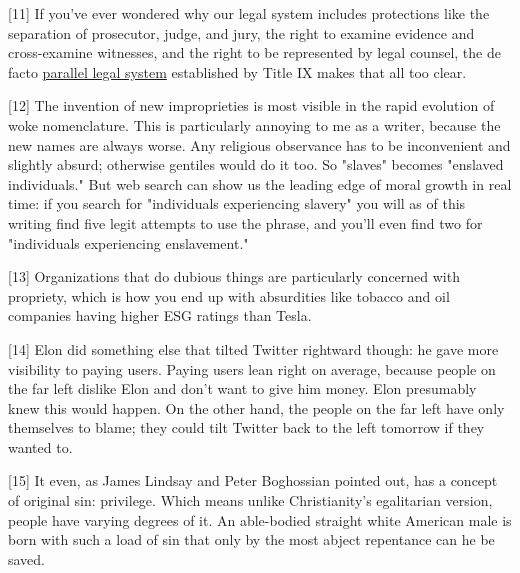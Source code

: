[11] If you've ever wondered why our legal system includes
                  protections like the separation of prosecutor, judge, and
                  jury, the right to examine evidence and cross-examine
                  witnesses, and the right to be represented by legal counsel,
                  the de facto
                  \href{https://www.nytimes.com/2020/03/18/magazine/title-ix-sexual-harassment-accusations.html}{parallel legal system}
                  established by Title IX makes that all too clear.

[12] The invention of new improprieties is most visible in the
                  rapid evolution of woke nomenclature. This is particularly
                  annoying to me as a writer, because the new names are always
                  worse. Any religious observance has to be inconvenient and
                  slightly absurd; otherwise gentiles would do it too. So
                  "slaves" becomes "enslaved individuals." But web search can
                  show us the leading edge of moral growth in real time: if you
                  search for "individuals experiencing slavery" you will as of
                  this writing find five legit attempts to use the phrase, and
                  you'll even find two for "individuals experiencing
                  enslavement."

[13] Organizations that do dubious things are particularly
                  concerned with propriety, which is how you end up with
                  absurdities like tobacco and oil companies having higher ESG
                  ratings than Tesla.

[14] Elon did something else that tilted Twitter rightward
                  though: he gave more visibility to paying users. Paying users
                  lean right on average, because people on the far left dislike
                  Elon and don't want to give him money. Elon presumably knew
                  this would happen. On the other hand, the people on the far
                  left have only themselves to blame; they could tilt Twitter
                  back to the left tomorrow if they wanted to.

[15] It even, as James Lindsay and Peter Boghossian pointed out,
                  has a concept of original sin: privilege. Which means unlike
                  Christianity's egalitarian version, people have varying
                  degrees of it. An able-bodied straight white American male is
                  born with such a load of sin that only by the most abject
                  repentance can he be saved.


